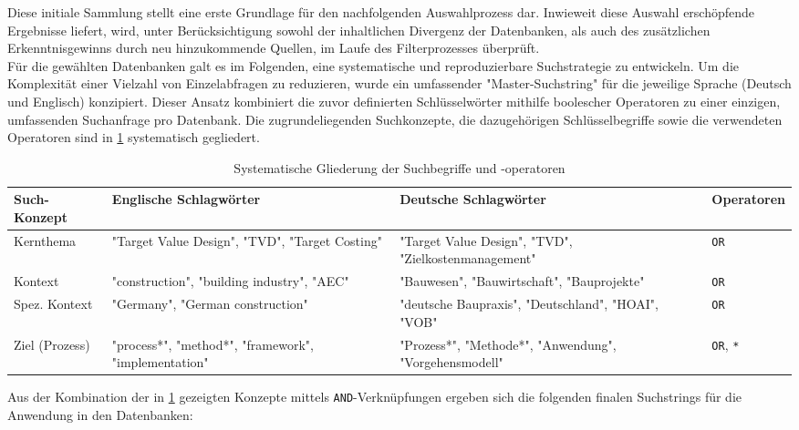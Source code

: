 Diese initiale Sammlung stellt eine erste Grundlage für den nachfolgenden Auswahlprozess dar. Inwieweit diese Auswahl erschöpfende Ergebnisse liefert, wird, unter Berücksichtigung sowohl der inhaltlichen Divergenz der Datenbanken, als auch des zusätzlichen Erkenntnisgewinns durch neu hinzukommende Quellen, im Laufe des Filterprozesses überprüft.\\
Für die gewählten Datenbanken galt es im Folgenden, eine systematische und reproduzierbare Suchstrategie zu entwickeln. Um die Komplexität einer Vielzahl von Einzelabfragen zu reduzieren, wurde ein umfassender "Master-Suchstring"  für die jeweilige Sprache (Deutsch und Englisch) konzipiert. Dieser Ansatz kombiniert die zuvor definierten Schlüsselwörter mithilfe boolescher Operatoren zu einer einzigen, umfassenden Suchanfrage pro Datenbank.
Die zugrundeliegenden Suchkonzepte, die dazugehörigen Schlüsselbegriffe sowie die verwendeten Operatoren sind in \cref{tab:suchstrategie} systematisch gegliedert.

\begin{table}[hbt!]
  \centering
  \caption{Systematische Gliederung der Suchbegriffe und -operatoren}
  \label{tab:suchstrategie}
  \begin{tabularx}{\textwidth}{l >{\raggedright\arraybackslash}X >{\raggedright\arraybackslash}X l}
    \toprule
    \textbf{Such-Konzept} & \textbf{Englische Schlagwörter} & \textbf{Deutsche Schlagwörter} & \textbf{Operatoren} \\
    \midrule
    Kernthema & "Target Value Design", "TVD", "Target Costing" & "Target Value Design", "TVD", "Zielkostenmanagement" & \texttt{OR} \\
    \addlinespace
    Kontext & "construction", "building industry", "AEC" & "Bauwesen", "Bauwirtschaft", "Bauprojekte" & \texttt{OR} \\
    \addlinespace
    Spez. Kontext & "Germany", "German construction" & "deutsche Baupraxis", "Deutschland", "HOAI", "VOB" & \texttt{OR} \\
    \addlinespace
    Ziel (Prozess) & "process*", "method*", "framework", "implementation" & "Prozess*", "Methode*", "Anwendung", "Vorgehensmodell" & \texttt{OR}, \texttt{*} \\
    \bottomrule
  \end{tabularx}
\end{table}

\FloatBarrier

Aus der Kombination der in \cref{tab:suchstrategie} gezeigten Konzepte mittels \texttt{AND}-Verknüpfungen ergeben sich die folgenden finalen Suchstrings für die Anwendung in den Datenbanken:

